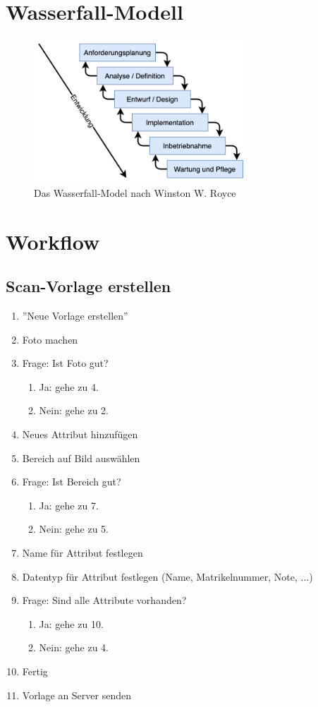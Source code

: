 \documentclass[notables, nomenclature, oneside, 150]{HSMW-Thesis}
\begin{document}
\Anhang

\chapter{Wasserfall-Modell}
	\begin{figure}[th]
   		\centering
   		\includegraphics[width=0.7\textwidth]{img/waterfall}
   		\caption{Das Wasserfall-Model nach Winston W. Royce}
   		\label{fig:waterfall}
   \end{figure}

\chapter{Workflow} \label{ch:workflow}
	\section*{Scan-Vorlage erstellen}
	\begin{enumerate}
		\item ''Neue Vorlage erstellen''
		\item Foto machen
		\item Frage: Ist Foto gut? 
		\begin{enumerate}
			\item Ja: gehe zu 4.
			\item Nein: gehe zu 2.
		\end{enumerate}
		\item Neues Attribut hinzufügen
		\item Bereich auf Bild auswählen
		\item Frage: Ist Bereich gut?
		\begin{enumerate}
			\item Ja: gehe zu 7.
			\item Nein: gehe zu 5.
		\end{enumerate}
		\item Name für Attribut festlegen
		\item Datentyp für Attribut festlegen (Name, Matrikelnummer, Note, ...)
		\item Frage: Sind alle Attribute vorhanden?
		\begin{enumerate}
			\item Ja: gehe zu 10.
			\item Nein: gehe zu 4.
		\end{enumerate}
		\item Fertig
		\item Vorlage an Server senden
	\end{enumerate}
	
\end{document}
